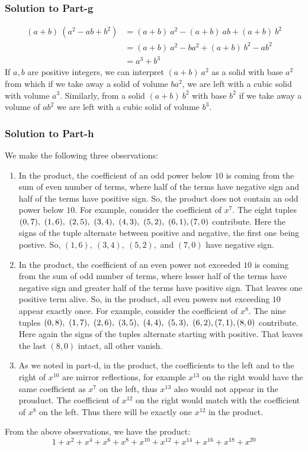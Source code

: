 \documentclass[12pt]{article}
\begin{document}
\subsubsection*{Solution to Part-g}
\begin{displaymath}
	\begin{split}
		(a+b)\ \left( a^2 - ab + b^2 \right) &= (a+b)\ a^2 - (a+b)\ ab + (a+b)\ b^2\\
											 &= (a+b)\ a^2 - ba^2 + (a+b)\ b^2 - ab^2\\
											 &= a^3+b^3
	\end{split}
\end{displaymath}
If $a,b$ are positive integers, we can interpret $(a+b)\ a^2$ as a solid with base $a^2$ from which if we take away a solid of volume $ba^2$, we are left with a cubic solid with volume $a^3$. Similarly, from a solid $(a+b)\ b^2$ with base $b^2$ if we take away a volume of $ab^2$ we are left with a cubic solid of volume $b^3$.

\subsubsection*{Solution to Part-h}
We make the following three observations:
\begin{enumerate}
\item In the product, the coefficient of an odd power below $10$ is coming from the sum of even number of terms, where half of the terms have negative sign and half of the terms have positive sign. So, the product does not contain an odd power below $10$. For example, consider the coefficient of $x^7$. The eight tuples $(0, 7),\ (1,6),\ (2,5),\ (3,4),\ (4,3),\ (5,2),\ (6,1),\ \\ (7,0)$ contribute. Here the signs of the tuple alternate between positive and negative, the first one being postive. So, $(1,6),\ (3,4),\ (5,2),$ and $(7,0)$ have negative sign.
\item In the product, the coefficient of an even power not exceeded $10$ is coming from the sum of odd number of terms, where lesser half of the terms have negative sign and greater half of the terms have positive sign. That leaves one positive term alive. So, in the product, all even powers not exceeding $10$ appear exactly once. For example, consider the coefficient of $x^8$. The nine tuples $(0,8),\ (1,7),\ (2,6),\ (3,5),\ (4,4),\ (5,3),\ (6,2),\\(7,1),(8,0)$ contribute. Here again the signs of the tuples alternate starting with positive. That leaves the last $(8,0)$ intact, all other vanish.
\item As we noted in part-d, in the product, the coefficients to the left and to the right of $x^{10}$ are mirror reflections, for example $x^{13}$ on the right would have the same coefficient as $x^7$ on the left, thus $x^{13}$ also would not appear in the prouduct. The coefficient of $x^{12}$ on the right would match with the coefficient of $x^{8}$ on the left. Thus there will be exactly one $x^{12}$ in the product. 
\end{enumerate}
From the above observations, we have the product:
\[
1 + x^2 + x^4 + x^6 + x^8 + x^{10} + x^{12} + x^{14} + x^{16} + x^{18} + x^{20}
\]
\end{document}
